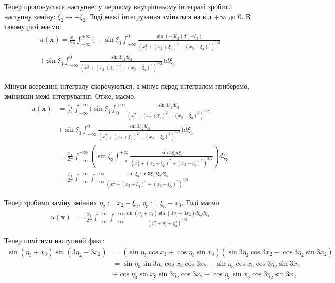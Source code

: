 \documentclass{hw_template}
\begin{document}
Тепер пропонується наступне: у першому внутрішньому інтегралі зробити наступну заміну: $\xi_2 \mapsto -\xi_2$. Тоді межі інтегрування зміняться на від $+\infty$ до $0$. В такому разі маємо:
\begin{align*}
    u(\mathbf{x}) = \frac{x_1}{2\pi}\int_{-\infty}^{+\infty}\Bigg(-\sin\xi_3\int_{+\infty}^0 \frac{\sin (-3\xi_2)d(-\xi_2)}{\left(x_1^2+(x_2+\xi_2)^2+(x_3-\xi_3)^2\right)^{3/2}} \\+ \sin\xi_3 \int_{-\infty}^0 \frac{\sin 3\xi_2d\xi_2}{\left(x_1^2+(x_2+\xi_2)^2+(x_3-\xi_3)^2\right)^{3/2}} \Bigg)d\xi_3
\end{align*}

Мінуси всередині інтегралу скорочуються, а мінус перед інтегралом приберемо, змінивши межі інтегрування. Отже, маємо:
\begin{align*}
    u(\mathbf{x}) &= \frac{x_1}{2\pi}\int_{-\infty}^{+\infty}\Bigg(\sin\xi_3\int_{0}^{+\infty} \frac{\sin 3\xi_2d\xi_2}{\left(x_1^2+(x_2+\xi_2)^2+(x_3-\xi_3)^2\right)^{3/2}} \\&+ \sin\xi_3 \int_{-\infty}^0 \frac{\sin 3\xi_2d\xi_2}{\left(x_1^2+(x_2+\xi_2)^2+(x_3-\xi_3)^2\right)^{3/2}} \Bigg)d\xi_3 \\
    &= \frac{x_1}{2\pi}\int_{-\infty}^{+\infty}\left(\sin\xi_3\int_{-\infty}^{+\infty}\frac{\sin 3\xi_2d\xi_2}{\left(x_1^2+(x_2+\xi_2)^2+(x_3-\xi_3)^2\right)^{3/2}}\right)d\xi_3 \\
    &= \frac{x_1}{2\pi}\int_{-\infty}^{+\infty}\int_{-\infty}^{+\infty}\frac{\sin\xi_3\sin 3\xi_2d\xi_2d\xi_3}{\left(x_1^2+(x_2+\xi_2)^2+(x_3-\xi_3)^2\right)^{3/2}}
\end{align*}

Тепер зробимо заміну змінних $\eta_2 := x_2+\xi_2$, $\eta_3 := \xi_3-x_3$. Тоді маємо:
\begin{align*}
    u(\mathbf{x}) &= \frac{x_1}{2\pi}\int_{-\infty}^{+\infty}\int_{-\infty}^{+\infty}\frac{\sin(\eta_3+x_3)\sin(3\eta_2-3x_2)d\eta_2d\eta_3}{\left(x_1^2+\eta_2^2+\eta_3^2\right)^{3/2}}
\end{align*}

Тепер помітимо наступний факт:
\begin{align*}
    \sin(\eta_3+x_3)\sin(3\eta_2-3x_2) &= (\sin\eta_3\cos x_3+\cos\eta_3 \sin x_3)(\sin 3\eta_2 \cos 3x_2 - \cos 3\eta_2 \sin 3x_2) \\
    &= \sin\eta_3\sin 3\eta_2 \cos x_3 \cos 3x_2 - \sin\eta_3\cos x_3 \cos 3\eta_2\sin 3x_2\\
    &+ \cos\eta_3 \sin x_3\sin 3\eta_2 \cos 3x_2 - \cos\eta_3 \sin x_3\cos 3\eta_2 \sin 3x_2
\end{align*}
\end{document}
